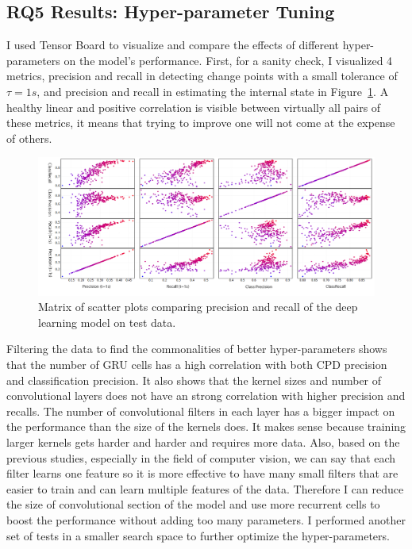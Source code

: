 \subsection{RQ5 Results: Hyper-parameter Tuning}
I used Tensor Board to visualize and compare the effects of different hyper-parameters on the model's performance. First, for a sanity check, I visualized 4 metrics, precision and recall in detecting change points with a small tolerance of $\tau=1s$, and precision and recall in estimating the internal state in Figure~\ref{fig:precision_recall_matrix}. A healthy linear and positive correlation is visible between virtually all pairs of these metrics, it means that trying to improve one will not come at the expense of others. 
\begin{figure}
    \centering
    \includegraphics[width=\columnwidth]{RQ3-5_charts/prec_recall_matrix_tuning_white_background.png}
    \caption{Matrix of scatter plots comparing precision and recall of the deep learning model on test data.}
    \label{fig:precision_recall_matrix}
\end{figure}

Filtering the data to find the commonalities of better hyper-parameters shows that the number of GRU cells has a high correlation with both CPD precision and classification precision. 
It also shows that the kernel sizes and number of convolutional layers does not have an strong correlation with higher precision and recalls. The number of convolutional filters in each layer has a bigger impact on the performance than the size of the kernels does. 
It makes sense because training larger kernels gets harder and harder and requires more data. Also, based on the previous studies, especially in the field of computer vision, we can say that each filter learns one feature so it is more effective to have many small filters that are easier to train and can learn multiple features of the data.
Therefore I can reduce the size of convolutional section of the model and use more recurrent cells to boost the performance without adding too many parameters. I performed another set of tests in a smaller search space to further optimize the hyper-parameters.

